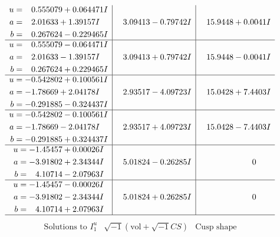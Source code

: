 \documentclass[1p]{elsarticle_modified}
\theoremstyle{definition}
\newcommand{\I}{\sqrt{-1}}
\begin{document}
$$\begin{array}{c|c|c}
\begin{aligned}
u &= \phantom{-}0.555079 + 0.064471 I \\
a &= \phantom{-}2.01633 + 1.39157 I \\
b &= \phantom{-}0.267624 - 0.229465 I\end{aligned}
 & \phantom{-}3.09413 - 0.79742 I & \phantom{-}15.9448 + 0.0041 I \\ \hline\begin{aligned}
u &= \phantom{-}0.555079 - 0.064471 I \\
a &= \phantom{-}2.01633 - 1.39157 I \\
b &= \phantom{-}0.267624 + 0.229465 I\end{aligned}
 & \phantom{-}3.09413 + 0.79742 I & \phantom{-}15.9448 - 0.0041 I \\ \hline\begin{aligned}
u &= -0.542802 + 0.100561 I \\
a &= -1.78669 + 2.04178 I \\
b &= -0.291885 - 0.324437 I\end{aligned}
 & \phantom{-}2.93517 - 4.09723 I & \phantom{-}15.0428 + 7.4403 I \\ \hline\begin{aligned}
u &= -0.542802 - 0.100561 I \\
a &= -1.78669 - 2.04178 I \\
b &= -0.291885 + 0.324437 I\end{aligned}
 & \phantom{-}2.93517 + 4.09723 I & \phantom{-}15.0428 - 7.4403 I \\ \hline\begin{aligned}
u &= -1.45457 + 0.00026 I \\
a &= -3.91802 + 2.34344 I \\
b &= \phantom{-}4.10714 - 2.07963 I\end{aligned}
 & \phantom{-}5.01824 - 0.26285 I & \phantom{-0.000000 } 0 \\ \hline\begin{aligned}
u &= -1.45457 - 0.00026 I \\
a &= -3.91802 - 2.34344 I \\
b &= \phantom{-}4.10714 + 2.07963 I\end{aligned}
 & \phantom{-}5.01824 + 0.26285 I & \phantom{-0.000000 } 0\\
 \hline 
 \end{array}$$\newpage$$\begin{array}{c|c|c}  
\text{Solutions to }I^u_{1}& \I (\text{vol} + \sqrt{-1}CS) & \text{Cusp shape}\\

\end{array}$$
\end{document}
